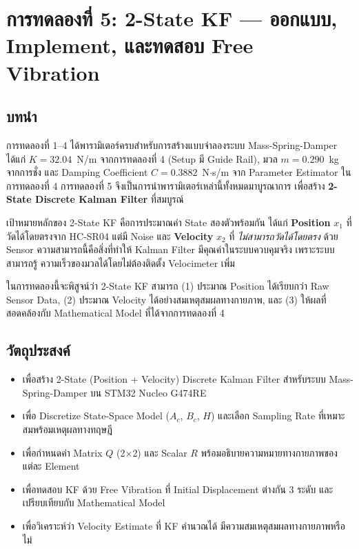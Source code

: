 
\section{การทดลองที่ 5: 2-State KF --- ออกแบบ, Implement, และทดสอบ Free Vibration}

\subsection{บทนำ}

การทดลองที่ 1--4 ได้พารามิเตอร์ครบสำหรับการสร้างแบบจำลองระบบ Mass-Spring-Damper
ได้แก่ $K = 32.04$~N/m จากการทดลองที่ 4 (Setup มี Guide Rail), มวล $m = 0.290$~kg
จากการชั่ง และ Damping Coefficient $C = 0.3882$~N$\cdot$s/m จาก Parameter Estimator
ในการทดลองที่ 4 การทดลองที่ 5 จึงเป็นการนำพารามิเตอร์เหล่านี้ทั้งหมดมาบูรณาการ
เพื่อสร้าง \textbf{2-State Discrete Kalman Filter} ที่สมบูรณ์

เป้าหมายหลักของ 2-State KF คือการประมาณค่า State สองตัวพร้อมกัน ได้แก่
\textbf{Position} $x_1$ ที่วัดได้โดยตรงจาก HC-SR04 แต่มี Noise
และ \textbf{Velocity} $x_2$ ที่ \textit{ไม่สามารถวัดได้โดยตรง} ด้วย Sensor
ความสามารถนี้คือสิ่งที่ทำให้ Kalman Filter มีคุณค่าในระบบควบคุมจริง
เพราะระบบสามารถรู้ ความเร็วของมวลได้โดยไม่ต้องติดตั้ง Velocimeter เพิ่ม

ในการทดลองนี้จะพิสูจน์ว่า 2-State KF สามารถ (1) ประมาณ Position ได้เรียบกว่า
Raw Sensor Data, (2) ประมาณ Velocity ได้อย่างสมเหตุสมผลทางกายภาพ,
และ (3) ให้ผลที่สอดคล้องกับ Mathematical Model ที่ได้จากการทดลองที่ 4

\subsection{วัตถุประสงค์}

\begin{itemize}
    \item เพื่อสร้าง 2-State (Position + Velocity) Discrete Kalman Filter
          สำหรับระบบ Mass-Spring-Damper บน STM32 Nucleo G474RE
    \item เพื่อ Discretize State-Space Model ($A_c$, $B_c$, $H$)
          และเลือก Sampling Rate ที่เหมาะสมพร้อมเหตุผลทางทฤษฎี
    \item เพื่อกำหนดค่า Matrix $Q$ (2$\times$2) และ Scalar $R$
          พร้อมอธิบายความหมายทางกายภาพของแต่ละ Element
    \item เพื่อทดสอบ KF ด้วย Free Vibration ที่ Initial Displacement
          ต่างกัน 3 ระดับ และเปรียบเทียบกับ Mathematical Model
    \item เพื่อวิเคราะห์ว่า Velocity Estimate ที่ KF คำนวณได้
          มีความสมเหตุสมผลทางกายภาพหรือไม่
\end{itemize}

